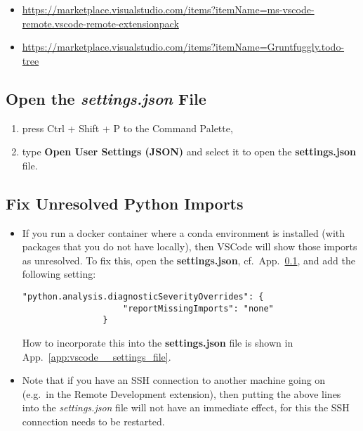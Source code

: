 \documentclass[12pt, a4paper]{article}
\numberwithin{equation}{section}
\theoremstyle{definition}
\theoremstyle{definition}
\begin{document}
		\begin{itemize}
					
			\item  \url{https://marketplace.visualstudio.com/items?itemName=ms-vscode-remote.vscode-remote-extensionpack}
		
			\item \url{https://marketplace.visualstudio.com/items?itemName=Gruntfuggly.todo-tree}
		
		\end{itemize}	

	\subsection{Open the \textit{settings.json} File}\label{app:open_settings_file_vs}
		
		\begin{enumerate}
			\item press Ctrl + Shift + P to the Command Palette, 
			\item type \textbf{Open User Settings (JSON)} and select it to open the \textbf{settings.json} file.
		\end{enumerate}


	\subsection{Fix Unresolved Python Imports}
	
		\begin{itemize}
			\item If you run a docker container where a conda environment is installed (with packages that you do not have locally), then VSCode will show those imports as unresolved. To fix this, open the \textbf{settings.json}, cf.~App.~\ref{app:open_settings_file_vs}, and add the following setting: 
			
			\begin{lstlisting}[style=mystylepython, label=alg:vscode_pylance__unresolved_imports, xleftmargin=\parindent]
				"python.analysis.diagnosticSeverityOverrides": {
				    "reportMissingImports": "none"                          
				}
			\end{lstlisting}
			
			How to incorporate this into the \textbf{settings.json} file is shown in App.~\ref{app:vscode__settings_file}.
			
			\item Note that if you have an SSH connection to another machine going on (e.g.~in the Remote Development extension), then putting the above lines into the \textit{settings.json} file will not have an immediate effect, for this the SSH connection needs to be restarted.
			
		\end{itemize}
	
\end{document}
